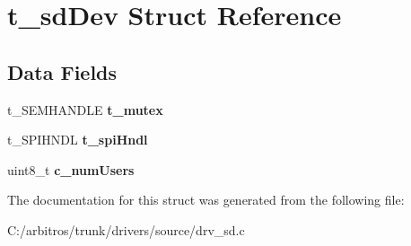 \hypertarget{structt__sd_dev}{\section{t\-\_\-sd\-Dev Struct Reference}
\label{structt__sd_dev}
}
\subsection*{Data Fields}
\begin{DoxyCompactItemize}
\item 
\hypertarget{structt__sd_dev_ab0543e5662ae0b4ef5014d2c76ab248d}{t\-\_\-\-S\-E\-M\-H\-A\-N\-D\-L\-E {\bfseries t\-\_\-mutex}}\label{structt__sd_dev_ab0543e5662ae0b4ef5014d2c76ab248d}

\item 
\hypertarget{structt__sd_dev_a39cdf43ce67d2d3ea09fb071b3ced92a}{t\-\_\-\-S\-P\-I\-H\-N\-D\-L {\bfseries t\-\_\-spi\-Hndl}}\label{structt__sd_dev_a39cdf43ce67d2d3ea09fb071b3ced92a}

\item 
\hypertarget{structt__sd_dev_a65907c8d88006e5cdc5e6b18eb4606ba}{uint8\-\_\-t {\bfseries c\-\_\-num\-Users}}\label{structt__sd_dev_a65907c8d88006e5cdc5e6b18eb4606ba}

\end{DoxyCompactItemize}


The documentation for this struct was generated from the following file\-:\begin{DoxyCompactItemize}
\item 
C\-:/arbitros/trunk/drivers/source/drv\-\_\-sd.\-c\end{DoxyCompactItemize}
